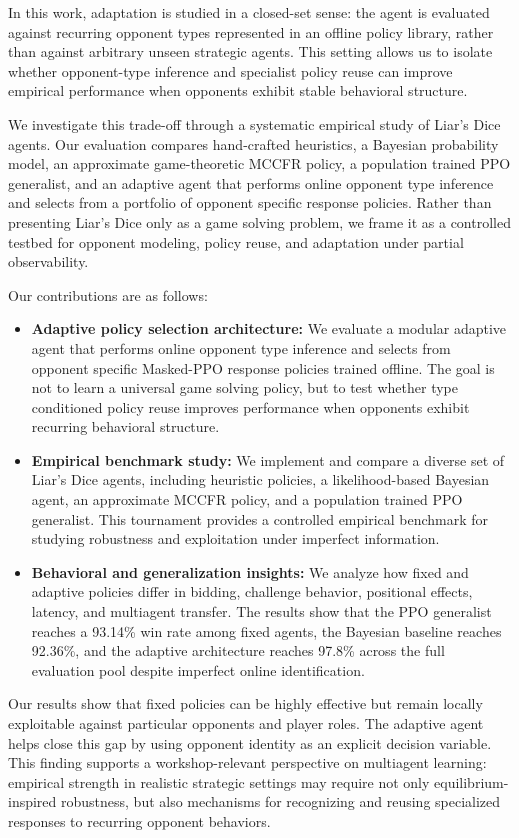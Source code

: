 \documentclass{article}
\begin{document}
In this work, adaptation is studied in a closed-set sense: the agent is evaluated against recurring opponent types represented in an offline policy library, rather than against arbitrary unseen strategic agents. This setting allows us to isolate whether opponent-type inference and specialist policy reuse can improve empirical performance when opponents exhibit stable behavioral structure.


We investigate this trade-off through a systematic empirical study of Liar’s Dice agents. Our evaluation compares hand-crafted heuristics, a Bayesian probability model, an approximate game-theoretic MCCFR policy, a population trained PPO generalist, and an adaptive agent that performs online opponent type inference and selects from a portfolio of opponent specific response policies. Rather than presenting Liar’s Dice only as a game solving problem, we frame it as a controlled testbed for opponent modeling, policy reuse, and adaptation under partial observability.

Our contributions are as follows:
\begin{itemize}

\item \textbf{Adaptive policy selection architecture:} We evaluate a modular adaptive agent that performs online opponent type inference and selects from opponent specific Masked-PPO response policies trained offline. The goal is not to learn a universal game solving policy, but to test whether type conditioned policy reuse improves performance when opponents exhibit recurring behavioral structure.


\item \textbf{Empirical benchmark study:} We implement and compare a diverse set of Liar's Dice agents, including heuristic policies, a likelihood-based Bayesian agent, an approximate MCCFR policy, and a population trained PPO generalist. This tournament provides a controlled empirical benchmark for studying robustness and exploitation under imperfect information.


\item \textbf{Behavioral and generalization insights:} We analyze how fixed and adaptive policies differ in bidding, challenge behavior, positional effects, latency, and multiagent transfer. The results show that the PPO generalist reaches a 93.14\% win rate among fixed agents, the Bayesian baseline reaches 92.36\%, and the adaptive architecture reaches 97.8\% across the full evaluation pool despite imperfect online identification.
\end{itemize}
Our results show that fixed policies can be highly effective but remain locally exploitable against particular opponents and player roles. The adaptive agent helps close this gap by using opponent identity as an explicit decision variable. This finding supports a workshop-relevant perspective on multiagent learning: empirical strength in realistic strategic settings may require not only equilibrium-inspired robustness, but also mechanisms for recognizing and reusing specialized responses to recurring opponent behaviors.
\end{document}
